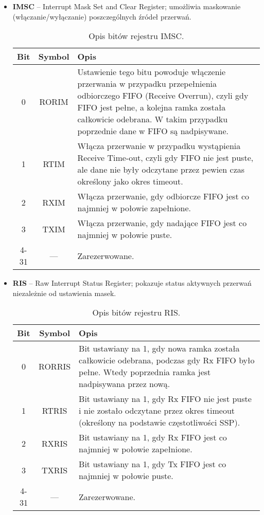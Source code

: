 \begin{itemize}
  
  \item \textbf{IMSC} – Interrupt Mask Set and Clear Register; umożliwia maskowanie (włączanie/wyłączanie) poszczególnych źródeł przerwań.

\begin{table}[H]
\centering
\caption{Opis bitów rejestru IMSC.}
\vspace{0.5em}
\renewcommand{\arraystretch}{1.2}
\begin{tabular}{|c|c|p{9.5cm}|}
\hline
\textbf{Bit} & \textbf{Symbol} & \textbf{Opis} \\
\hline
0 & RORIM & Ustawienie tego bitu powoduje włączenie przerwania w przypadku przepełnienia odbiorczego FIFO (Receive Overrun), czyli gdy FIFO jest pełne, a kolejna ramka została całkowicie odebrana. W takim przypadku poprzednie dane w FIFO są nadpisywane. \\
\hline
1 & RTIM & Włącza przerwanie w przypadku wystąpienia Receive Time-out, czyli gdy FIFO nie jest puste, ale dane nie były odczytane przez pewien czas określony jako okres timeout. \\
\hline
2 & RXIM & Włącza przerwanie, gdy odbiorcze FIFO jest co najmniej w połowie zapełnione. \\
\hline
3 & TXIM & Włącza przerwanie, gdy nadające FIFO jest co najmniej w połowie puste. \\
\hline
4-31 & — & Zarezerwowane.\\
\hline
\end{tabular}
\end{table}

  
  \item \textbf{RIS} – Raw Interrupt Status Register; pokazuje status aktywnych przerwań niezależnie od ustawienia masek.

\begin{table}[H]
\centering
\caption{Opis bitów rejestru RIS.}
\vspace{0.5em}
\renewcommand{\arraystretch}{1.2}
\begin{tabular}{|c|c|p{9.5cm}|}
\hline
\textbf{Bit} & \textbf{Symbol} & \textbf{Opis} \\
\hline
0 & RORRIS & Bit ustawiany na 1, gdy nowa ramka została całkowicie odebrana, podczas gdy Rx FIFO było pełne. Wtedy poprzednia ramka jest nadpisywana przez nową. \\
\hline
1 & RTRIS & Bit ustawiany na 1, gdy Rx FIFO nie jest puste i nie zostało odczytane przez okres timeout (określony na podstawie częstotliwości SSP). \\
\hline
2 & RXRIS & Bit ustawiany na 1, gdy Rx FIFO jest co najmniej w połowie zapełnione. \\
\hline
3 & TXRIS & Bit ustawiany na 1, gdy Tx FIFO jest co najmniej w połowie puste. \\
\hline
4-31 & — & Zarezerwowane. \\
\hline
\end{tabular}
\end{table}


\end{itemize}
